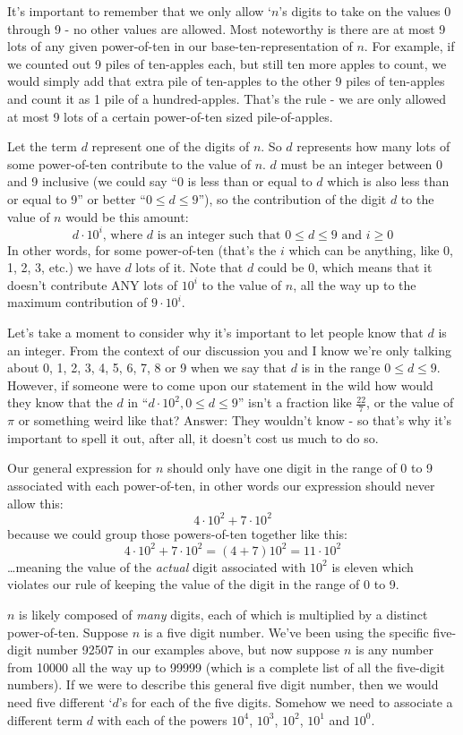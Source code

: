 \documentclass{article}
\begin{document}
It's important to remember that we only allow `$n$'s digits to take on the values 0 through 9 - no other values are allowed.
Most noteworthy is there are at most 9 lots of any given
power-of-ten in our base-ten-representation of $n$.
For example, if we counted out 9 piles of ten-apples each, but still ten more apples to count, we would simply add that extra pile of ten-apples
to the other 9 piles of ten-apples and count it as 1 pile of a hundred-apples.  That's the rule - we are only allowed
at most 9 lots of a certain power-of-ten sized pile-of-apples.

Let the term $d$ represent one of the digits of $n$.
So $d$ represents how many lots of some power-of-ten contribute to the value of $n$.
$d$ must be an integer between 0 and 9 inclusive (we could say ``0 is less than or equal to $d$ which is also less than
or equal to 9'' or better ``$0\le{}d\le9$''), so the contribution of the digit $d$ to the value of $n$ would be this amount:
\[d\cdot10^i\text{, where }d\text{ is an integer such that }0\le{}d\le{}9\text{ and }i\ge{}0\]
In other words, for some power-of-ten
(that's the $i$ which can be anything, like 0, 1, 2, 3, etc.) we have $d$ lots of it. Note that $d$
could be 0, which means that it doesn't contribute ANY lots of $10^i$ to the value of $n$, all the way up to the maximum
contribution of $9\cdot{}10^i$.

Let's take a moment to consider why it's important to let people know that $d$ is an integer.
From the context of our discussion you and I know we're only
talking about 0, 1, 2, 3, 4, 5, 6, 7, 8 or 9 when we say that $d$ is in the range $0\le{}d\le{}9$.
However, if someone were to come upon our statement in the wild how would they know that
the $d$ in ``$d\cdot{}10^2, 0\le{}d\le9$'' isn't a fraction like $\frac{22}{7}$, or the value of $\pi$ or something weird like that?
Answer: They wouldn't know - so that's why it's important to spell it out, after all, it doesn't cost us much to do so.

Our general expression for $n$ should only have one digit in the range of 0 to 9 associated with each power-of-ten, in other words our expression should never allow this:
\[4\cdot10^2+7\cdot10^2\]
because we could group those powers-of-ten together like this:
\[4\cdot10^2+7\cdot10^2 = (4+7)10^2=11\cdot10^2\]
\dots{}meaning the value of the \emph{actual} digit associated with $10^2$ is eleven which violates our rule of keeping the value of the digit in the range of 0 to 9.

$n$ is likely composed of \emph{many} digits, each of which is multiplied by a distinct power-of-ten.
Suppose $n$ is a five digit number. We've been using the specific five-digit number 92507 in our examples above,
but now suppose $n$ is any number from 10000 all
the way up to 99999 (which is a complete list of all the five-digit numbers). If we were to describe
this general five digit number, then we would need five different `$d$'s for each of the five digits.
Somehow we need to associate a different term $d$ with each of the powers
$10^4$, $10^3$, $10^2$, $10^1$ and $10^0$.
\end{document}
